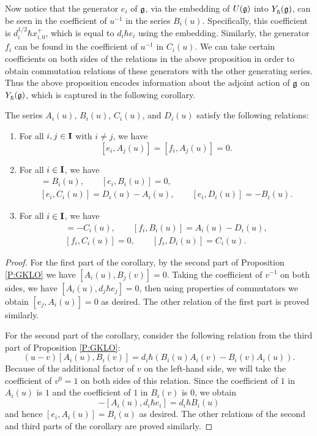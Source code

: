Now notice that the generator $e_i$ of $\mathfrak{g}$, via the embedding of $U(\mathfrak{g})$ into $Y_\hbar^{}(\mathfrak{g})$, can be seen in the coefficient of $u^{-1}$ in the series $B_i(u)$.
Specifically, this coefficient is $d_i^{1/2}\hbar x^+_{i,0}$, which is equal to $d_i\hbar e_i$ using the embedding.
Similarly, the generator $f_i$ can be found in the coefficient of $u^{-1}$ in $C_i(u)$.
We can take certain coefficients on both sides of the relations in the above proposition in order to obtain commutation relations of these generators with the other generating series.
Thus the above proposition encodes information about the adjoint action of $\mathfrak{g}$ on $Y_\hbar^{}(\mathfrak{g})$, which is captured in the following corollary.

\begin{corollary}\label{C:GKLO}
    The series $A_i(u)$, $B_i(u)$, $C_i(u)$, and $D_i(u)$ satisfy the following relations:
    \begin{enumerate}
        \item For all $i,j\in\mathbf{I}$ with $i\neq j$, we have
        \[[e_i,A_j(u)] = [f_i,A_j(u)] = 0.\]
        \item For all $i\in\mathbf{I}$, we have
        \begin{gather*}
            [e_i,A_i(u)] = B_i(u), \qquad [e_i,B_i(u)] = 0, \\
            [e_i,C_i(u)] = D_i(u)-A_i(u), \qquad [e_i,D_i(u)] = -B_i(u).
        \end{gather*}
        \item For all $i\in\mathbf{I}$, we have
        \begin{gather*}
            [f_i,A_i(u)] = -C_i(u), \qquad [f_i,B_i(u)] = A_i(u)-D_i(u), \\
            [f_i,C_i(u)] = 0, \qquad [f_i,D_i(u)] = C_i(u).
        \end{gather*}
    \end{enumerate}
\end{corollary}
\begin{proof}
    For the first part of the corollary, by the second part of Proposition \ref{P:GKLO} we have $[A_i(u), B_j(v)] = 0$.
    Taking the coefficient of $v^{-1}$ on both sides, we have $[A_i(u), d_j\hbar e_j] = 0$, then using properties of commutators we obtain $[e_j, A_i(u)] = 0$ as desired.
    The other relation of the first part is proved similarly.

    For the second part of the corollary, consider the following relation from the third part of Proposition \ref{P:GKLO}:
    \[(u-v)[A_i(u),B_i(v)] = d_i\hbar(B_i(u)A_i(v) - B_i(v)A_i(u)).\]
    Because of the additional factor of $v$ on the left-hand side, we will take the coefficient of $v^0=1$ on both sides of this relation.
    Since the coefficient of $1$ in $A_i(u)$ is $1$ and the coefficient of $1$ in $B_i(v)$ is $0$, we obtain
    \[-[A_i(u), d_i\hbar e_i] = d_i\hbar B_i(u)\]
    and hence $[e_i, A_i(u)] = B_i(u)$ as desired.
    The other relations of the second and third parts of the corollary are proved similarly.
\end{proof}


